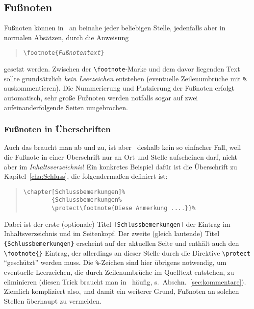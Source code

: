 



\subsection{Fußnoten}
Fußnoten können in \latex\ an beinahe jeder beliebigen Stelle,
jedenfalls aber in normalen Absätzen, durch die Anweisung
%
\begin{quote}
\verb!\footnote{!\texttt{\em Fußnotentext}\verb!}!
\end{quote}
%
gesetzt werden. Zwischen der \verb!\footnote!-Marke und dem davor
liegenden Text sollte grundsätzlich \emph{kein Leerzeichen} entstehen (eventuelle
Zeilen\-um\-brüche mit \verb!%! auskommentieren).
Die Nummerierung und Platzierung der Fußnoten
erfolgt automatisch, sehr große Fußnoten werden notfalls sogar auf
zwei aufeinanderfolgende Seiten umgebrochen.


\subsubsection{Fußnoten in Überschriften}

Auch das braucht man ab und zu, ist aber \va\ deshalb kein so
einfacher Fall, weil die Fußnote in einer Überschrift nur an Ort
und Stelle aufscheinen darf, nicht aber im \emph{Inhaltsverzeichnis}! Ein
konkretes Beispiel dafür ist die Überschrift zu
Kapitel~\ref{cha:Schluss}, die folgendermaßen definiert ist:
%
\begin{quote}
\begin{verbatim}
\chapter[Schlussbemerkungen]%
        {Schlussbemerkungen%
        \protect\footnote{Diese Anmerkung ....}}%
\end{verbatim}
\end{quote}
%
Dabei ist der erste (optionale) Titel \verb![Schlussbemerkungen]!
der Eintrag im Inhaltsverzeichnis und im Seitenkopf. 
Der zweite (gleich lautende) Titel
\texttt{\{Schlussbemerkungen\}} erscheint auf der aktuellen Seite und
enthält auch den \verb!\footnote{}! Eintrag, der allerdings an
dieser Stelle durch die Direktive \verb!\protect! "`geschützt"'
werden muss. Die \verb!%!-Zeichen sind hier übrigens notwendig,
um eventuelle Leerzeichen, die durch Zeilenumbrüche im Quelltext
entstehen, zu eliminieren (diesen Trick braucht man 
in \latex\ häufig, s.\ Abschn.~\ref{sec:kommentare}). 
Ziemlich kompliziert also, und damit 
ein weiterer Grund, Fußnoten an solchen Stellen überhaupt zu vermeiden.

